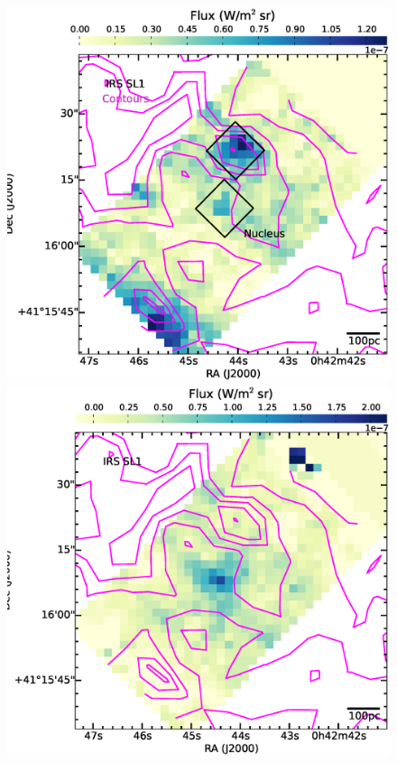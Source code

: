 \documentclass[useAMS,usenatbib,a4paper]{mn2e}
\begin{document}
\begin{figure}
\centering
\includegraphics[scale = 0.25]{./fig13a.eps}
\includegraphics[scale = 0.25]{./fig13b.eps}

\end{figure}
\end{document}
